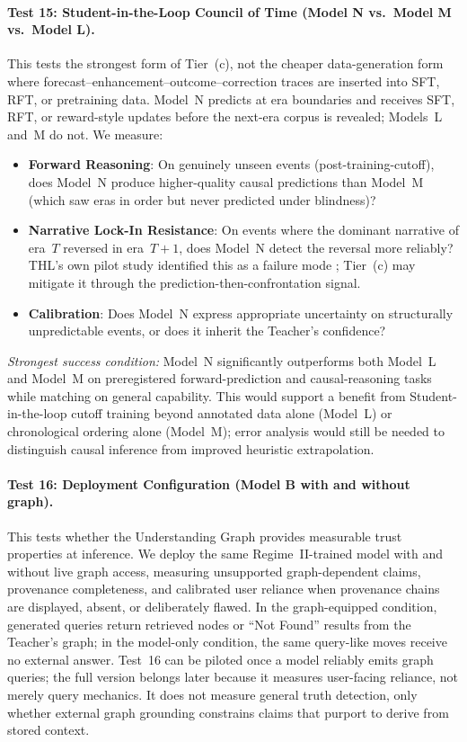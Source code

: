 \paragraph{Test 15: Student-in-the-Loop Council of Time (Model N vs.\ Model M vs.\ Model L).}
This tests the strongest form of Tier~(c), not the cheaper data-generation form where forecast--enhancement--outcome--correction traces are inserted into SFT, RFT, or pretraining data. Model~N predicts at era boundaries and receives SFT, RFT, or reward-style updates before the next-era corpus is revealed; Models~L and~M do not. We measure:
\begin{itemize}
    \item \textbf{Forward Reasoning}: On genuinely unseen events (post-training-cutoff), does Model~N produce higher-quality causal predictions than Model~M (which saw eras in order but never predicted under blindness)?
    \item \textbf{Narrative Lock-In Resistance}: On events where the dominant narrative of era~$T$ reversed in era~$T{+}1$, does Model~N detect the reversal more reliably? THL's own pilot study identified this as a failure mode \cite{westerberg2026thl}; Tier~(c) may mitigate it through the prediction-then-confrontation signal.
    \item \textbf{Calibration}: Does Model~N express appropriate uncertainty on structurally unpredictable events, or does it inherit the Teacher's confidence?
\end{itemize}
\emph{Strongest success condition:} Model~N significantly outperforms both
Model~L and Model~M on preregistered forward-prediction and causal-reasoning
tasks while matching on general capability. This would support a benefit from
Student-in-the-loop cutoff training beyond annotated data alone (Model~L) or
chronological ordering alone (Model~M); error analysis would still be needed to
distinguish causal inference from improved heuristic extrapolation.

\paragraph{Test 16: Deployment Configuration (Model B with and without graph).}
This tests whether the Understanding Graph provides measurable
trust properties at inference. We deploy the same Regime~II-trained model with
and without live graph access, measuring unsupported graph-dependent claims,
provenance completeness, and calibrated user reliance when provenance chains
are displayed, absent, or deliberately flawed.
In the graph-equipped condition, generated queries return retrieved nodes or
``Not Found'' results from the Teacher's graph; in the model-only condition,
the same query-like moves receive no external answer.
Test~16 can be piloted once a model reliably emits graph queries; the full
version belongs later because it measures user-facing reliance, not merely query
mechanics. It does not measure general truth detection, only whether external
graph grounding constrains claims that purport to derive from stored context.

